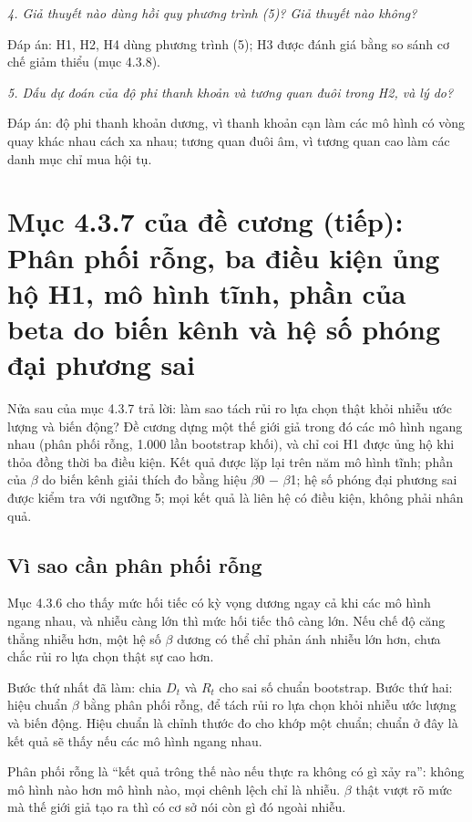 {\itshape 4. Giả thuyết nào dùng hồi quy phương trình (5)? Giả thuyết nào không?\par}

Đáp án: H1, H2, H4 dùng phương trình (5); H3 được đánh giá bằng so sánh cơ chế giảm thiểu (mục 4.3.8).

{\itshape 5. Dấu dự đoán của độ phi thanh khoản và tương quan đuôi trong H2, và lý do?\par}

Đáp án: độ phi thanh khoản dương, vì thanh khoản cạn làm các mô hình có vòng quay khác nhau cách xa nhau; tương quan đuôi âm, vì tương quan cao làm các danh mục chỉ mua hội tụ.

\chapter{Mục 4.3.7 của đề cương (tiếp): Phân phối rỗng, ba điều kiện ủng hộ H1, mô hình tĩnh, phần của beta do biến kênh và hệ số phóng đại phương sai}

Nửa sau của mục 4.3.7 trả lời: làm sao tách rủi ro lựa chọn thật khỏi nhiễu ước lượng và biến động? Đề cương dựng một thế giới giả trong đó các mô hình ngang nhau (phân phối rỗng, 1.000 lần bootstrap khối), và chỉ coi H1 được ủng hộ khi thỏa đồng thời ba điều kiện. Kết quả được lặp lại trên năm mô hình tĩnh; phần của \texorpdfstring{$\beta$}{beta} do biến kênh giải thích đo bằng hiệu \texorpdfstring{$\beta$}{beta}0 − \texorpdfstring{$\beta$}{beta}1; hệ số phóng đại phương sai được kiểm tra với ngưỡng 5; mọi kết quả là liên hệ có điều kiện, không phải nhân quả.

\section{Vì sao cần phân phối rỗng}

Mục 4.3.6 cho thấy mức hối tiếc có kỳ vọng dương ngay cả khi các mô hình ngang nhau, và nhiễu càng lớn thì mức hối tiếc thô càng lớn. Nếu chế độ căng thẳng nhiễu hơn, một hệ số \texorpdfstring{$\beta$}{beta} dương có thể chỉ phản ánh nhiễu lớn hơn, chưa chắc rủi ro lựa chọn thật sự cao hơn.

Bước thứ nhất đã làm: chia \(D_{t}\) và \(R_{t}\) cho sai số chuẩn bootstrap. Bước thứ hai: hiệu chuẩn \texorpdfstring{$\beta$}{beta} bằng phân phối rỗng, để tách rủi ro lựa chọn khỏi nhiễu ước lượng và biến động. Hiệu chuẩn là chỉnh thước đo cho khớp một chuẩn; chuẩn ở đây là kết quả sẽ thấy nếu các mô hình ngang nhau.

Phân phối rỗng là “kết quả trông thế nào nếu thực ra không có gì xảy ra”: không mô hình nào hơn mô hình nào, mọi chênh lệch chỉ là nhiễu. \texorpdfstring{$\beta$}{beta} thật vượt rõ mức mà thế giới giả tạo ra thì có cơ sở nói còn gì đó ngoài nhiễu.


